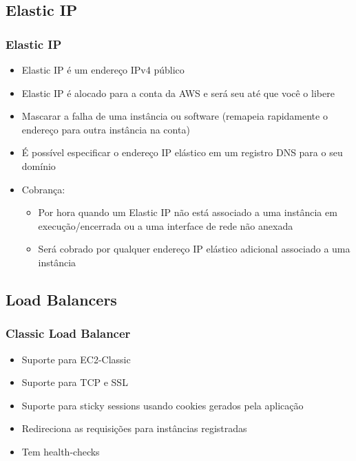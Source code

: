 \subsection{Elastic IP}

\begin{frame}
	\frametitle{Elastic IP}
	\begin{itemize}
		\item Elastic IP é um endereço IPv4 público
		\item Elastic IP é alocado para a conta da AWS e será seu até que você o libere
		\item Mascarar a falha de uma instância ou software (remapeia rapidamente o endereço para outra instância na conta)
		\item É possível especificar o endereço IP elástico em um registro DNS para o seu domínio
		\item Cobrança:
			\begin{itemize}
				\item Por hora quando um Elastic IP não está associado a uma instância em execução/encerrada ou a uma interface de rede não anexada
				\item Será cobrado por qualquer endereço IP elástico adicional associado a uma instância
			\end{itemize}
	\end{itemize}
\end{frame}

\subsection{Load Balancers}

\begin{frame}
	\frametitle{Classic Load Balancer}
	\begin{itemize}
		\item Suporte para EC2-Classic
		\item Suporte para TCP e SSL
		\item Suporte para sticky sessions usando cookies gerados pela aplicação
		\item Redireciona as requisições para instâncias registradas
		\item Tem health-checks
	\end{itemize}
\end{frame}

